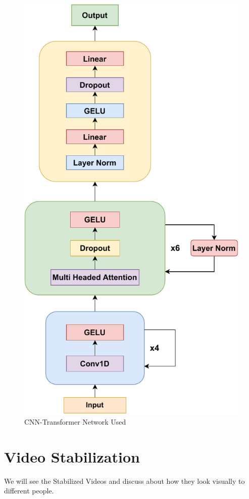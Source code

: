\begin{figure}
    \centering
    \includegraphics{images/fig_chapter2/nns/transformer_mt.pdf}
    \caption{CNN-Transformer Network Used}
    \label{fig:cnn_transformer_used}
\end{figure}


\section{Video Stabilization}
We will see the Stabilized Videos and discuss about how they look visually to different people.

